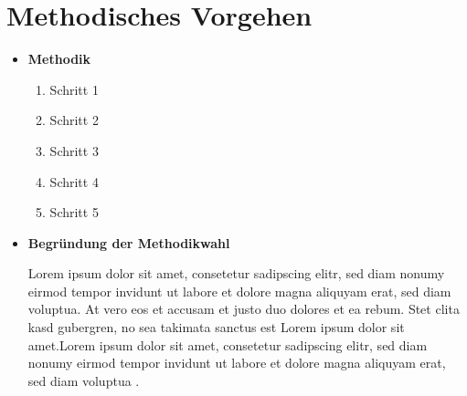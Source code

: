   \section{Methodisches Vorgehen}
  \label{subchap:methodisches_vorgehen}

  \begin{itemize}[label={}, leftmargin=0pt]
    \item\textbf{Methodik}

      \begin{enumerate}
          \item Schritt 1
          \item Schritt 2
          \item Schritt 3
          \item Schritt 4
          \item Schritt 5
      \end{enumerate}

    \item\textbf{Begründung der Methodikwahl}

      Lorem ipsum dolor sit amet, consetetur sadipscing elitr, sed diam nonumy eirmod tempor invidunt ut labore et dolore magna aliquyam erat, sed diam voluptua.
      At vero eos et accusam et justo duo dolores et ea rebum. Stet clita kasd gubergren, no sea takimata sanctus est Lorem ipsum dolor sit amet.Lorem ipsum dolor sit amet, consetetur sadipscing elitr, sed diam nonumy eirmod tempor invidunt ut labore et dolore magna aliquyam erat, sed diam voluptua \parencite[20--22]{howtocite}.

  \end{itemize}